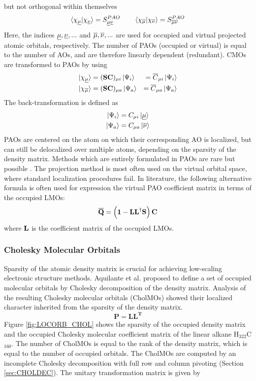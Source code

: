 \noindent but not orthogonal within themselves
\begin{equation}
\bra{\smash{\chi_{\underline{\mu}}}}\ket{\smash{\chi_{\underline{\nu}}}} = S^{PAO}_{\underline{\mu}\underline{\nu}} \qquad \bra{\smash{\chi_{\overline{\mu}}}}\ket{\smash{\chi_{\overline{\nu}}}} = S^{PAO}_{\overline{\mu}\overline{\nu}}
\end{equation}
\noindent Here, the indices $\underline{\mu},\underline{\nu},...$ and $\overline{\mu},\overline{\nu},...$ are used for occupied and virtual projected atomic orbitals, respectively. The number of PAOs (occupied or virtual) is equal to the number of AOs, and are therefore linearly dependent (redundant). CMOs are transformed to PAOs by using
\begin{eqnarray}
\ket{\smash{\chi_{\underline{\mu}}}} &= (\mathbf{SC})_{\mu i}  \ket{\smash{\Psi_i}} &= \overline{C}_{\mu i} \ket{\Psi_i} \\
\ket{\smash{\chi_{\overline{\mu}}}} &= (\mathbf{SC})_{\mu a} \ket{\smash{\Psi_a}} &=  \overline{C}_{\mu a} \ket{\Psi_a}
\label{CMO2PAO}
\end{eqnarray}
\noindent The back-transformation is defined as
\begin{eqnarray}
\ket{\smash{\Psi_{i}}} &= C_{\mu i} \ket{\smash{\underline{\mu}}} \\
\ket{\smash{\Psi_{a}}} &= C_{\mu a} \ket{\smash{\overline{\nu}}} 
\label{PAO2CMO}
\end{eqnarray}
PAOs are centered on the atom on which their corresponding AO is localized, but can still be delocalized over multiple atoms, depending on the sparsity of the density matrix. Methods which are entirely formulated in PAOs are rare but possible \cite{Chr2006}. The projection method is most often used on the virtual orbital space, where standard localization procedures fail. In literature, the following alternative formula is often used for expression the virtual PAO coefficient matrix in terms of the occupied LMOs:
\begin{equation}
\mathbf{\overline{Q}} = \left( \mathbf{1} - \mathbf{LL}^{\dagger} \mathbf{S} \right) \mathbf{C} 
\end{equation}
\noindent where $\mathbf{L}$ is the coefficient matrix of the occupied LMOs.

\subsubsection{Cholesky Molecular Orbitals}

Sparsity of the atomic density matrix is crucial for achieving low-scaling electronic structure methods. Aquilante et al. proposed \cite{Aqu2006} to define a set of occupied molecular orbitals by Cholesky decomposition of the density matrix. Analysis of the resulting Cholesky molecular orbitals (CholMOs) showed their localized character inherited from the sparsity of the density matrix.
\begin{equation}
\mathbf{P} = \mathbf{LL^T}
\end{equation}
Figure \ref{fig:LOCORB_CHOL} shows the sparsity of the occupied density matrix and the occupied Cholesky molecular coefficient matrix of the linear alkane H$_{322}$C$_{160}$. The number of CholMOs is equal to the rank of the density matrix, which is equal to the number of occupied orbitals. The CholMOs are computed by an incomplete Cholesky decomposition with full row and column pivoting (Section \ref{sec:CHOLDEC}). The unitary transformation matrix is given by

